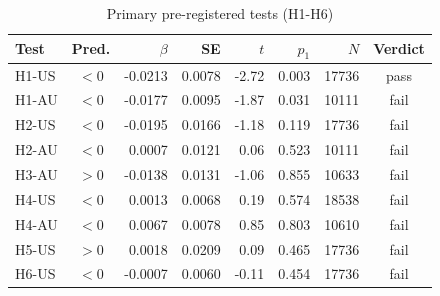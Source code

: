 \begin{table}[htbp]\centering\small
\caption{Primary pre-registered tests (H1-H6)}
\begin{tabular}{lcrrrrrc}\toprule
Test & Pred. & $\beta$ & SE & $t$ & $p_{1}$ & $N$ & Verdict \\ \midrule
H1-US & $<$0 & -0.0213 & 0.0078 & -2.72 & 0.003 & 17736 & pass \\
H1-AU & $<$0 & -0.0177 & 0.0095 & -1.87 & 0.031 & 10111 & fail \\
H2-US & $<$0 & -0.0195 & 0.0166 & -1.18 & 0.119 & 17736 & fail \\
H2-AU & $<$0 & 0.0007 & 0.0121 & 0.06 & 0.523 & 10111 & fail \\
H3-AU & $>$0 & -0.0138 & 0.0131 & -1.06 & 0.855 & 10633 & fail \\
H4-US & $<$0 & 0.0013 & 0.0068 & 0.19 & 0.574 & 18538 & fail \\
H4-AU & $<$0 & 0.0067 & 0.0078 & 0.85 & 0.803 & 10610 & fail \\
H5-US & $>$0 & 0.0018 & 0.0209 & 0.09 & 0.465 & 17736 & fail \\
H6-US & $<$0 & -0.0007 & 0.0060 & -0.11 & 0.454 & 17736 & fail \\
\bottomrule\end{tabular}\end{table}
